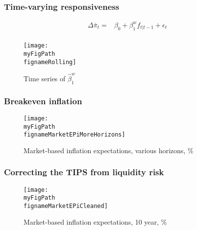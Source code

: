 \documentclass[10pt]{beamer}
\def \myFigPath {../../../figures/}
\def\fignameMarketEPiCleaned{cleaned_epi10_2020_07_28}
\def\fignameMarketEPiMoreHorizons{epi_be_in_data_command_anchoring_in_data_14_Sep_2020_18_12_59}
\def\fignameRolling{rolling_overlapping_command_anchoring_in_data_individual_23_Sep_2020_21_04_48}
\begin{document}
\begin{frame}[plain]  %
\frametitle{Time-varying responsiveness}\label{rolling}

\begin{align*}
\Delta\bar{\pi}_t = & \beta_0 + \beta^w_1 f_{t|t-1} + \epsilon_t \tag{1} \\
\end{align*}

\vspace{-0.7cm}

\begin{figure}[h!]
\texttt{[image: \\myFigPath \\fignameRolling]}
\caption{Time series of $\hat{\beta}_1^w$}
\label{rolling}
\end{figure}


\vfill
\vspace{-0.9cm}

\hfill \hyperlink{further_evidence}{}
\end{frame}

\begin{frame}[plain]  %
\frametitle{Breakeven inflation}
	\label{app_TIPS}

\begin{figure}[h!]
\texttt{[image: \\myFigPath \\fignameMarketEPiMoreHorizons]} %
\caption{Market-based inflation expectations, various horizons, \%}
\label{epi_cleaned}
\end{figure}

\vfill 
\hyperlink{LRE_drifting_down}{}	

\end{frame}

\begin{frame}[plain]  %
\frametitle{Correcting the TIPS from liquidity risk}

\begin{figure}[h!]
\texttt{[image: \\myFigPath \\fignameMarketEPiCleaned]} %
\caption{Market-based inflation expectations, 10 year, \%}
\label{epi_cleaned}
\end{figure}

\vfill 
\hyperlink{LRE_drifting_down}{}	

\end{frame}
\end{document}
